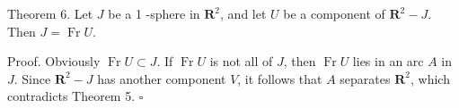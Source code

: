 Theorem 6. Let $J$ be a 1 -sphere in $\mathbf{R}^{2}$, and let $U$ be a component of $\mathbf{R}^{2}-J$. Then $J=\operatorname{Fr} U$.

Proof. Obviously $\operatorname{Fr} U \subset J$. If $\operatorname{Fr} U$ is not all of $J$, then $\operatorname{Fr} U$ lies in an arc $A$ in $J$. Since $\mathbf{R}^{2}-J$ has another component $V$, it follows that $A$ separates $\mathbf{R}^{2}$, which contradicts Theorem 5. \(\square\)
